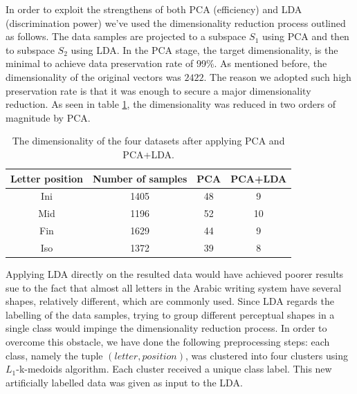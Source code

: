 \iftoggle{edit-mode}{\hspace{0pt}\marginpar{Implementation: PCA}}{}
In order to exploit the strengthens of both PCA (efficiency) and LDA (discrimination power) we've used the dimensionality reduction process outlined as follows. 
The data samples are projected to a subspace $S_1$ using PCA and then to subspace $S_2$ using LDA. 
In the PCA stage, the target dimensionality, is the minimal to achieve data preservation rate of 99\%. 
As mentioned before, the dimensionality of the original vectors was $2422$. 
The reason we adopted such high preservation rate is that it was enough to secure a major dimensionality reduction. 
As seen in table \ref{table:dr_dimensions_results}, the dimensionality was reduced in two orders of magnitude by PCA.

\begin{table}
\centering
\begin{tabular}{ | c | c | c | c |}
\hline
Letter position & Number of samples & PCA & PCA+LDA\\
\hline                 
  Ini & 1405 & 48 & 9 \\ 
  \hline
  Mid & 1196 & 52 & 10 \\ 
  \hline
  Fin & 1629 & 44 & 9 \\ 
  \hline
  Iso & 1372 & 39 & 8 \\ 
  \hline
\end{tabular}
\caption{The dimensionality of the four datasets after applying PCA and PCA+LDA.}
\label{table:dr_dimensions_results} 
\end{table}

\iftoggle{edit-mode}{\hspace{0pt}\marginpar{Implementation: Clustering and LDA}}{}
Applying LDA directly on the resulted data would have achieved poorer results sue to the fact that almost all letters in the Arabic writing system have several shapes, relatively different, which are commonly used. 
Since LDA regards the labelling of the data samples, trying to group different perceptual shapes in a single class would impinge the dimensionality reduction process. 
In order to overcome this obstacle, we have done the following preprocessing steps: each class, namely the tuple $(letter, position)$, was clustered into four clusters using $L_1$-k-medoids algorithm. 
Each cluster received a unique class label. 
This new artificially labelled data was given as input to the LDA.

